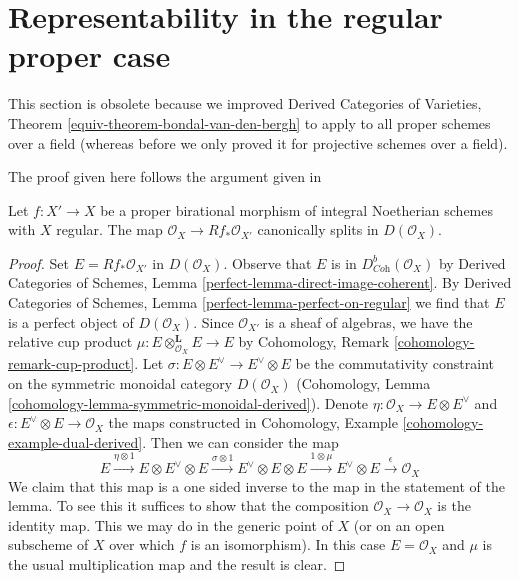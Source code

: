 \section{Representability in the regular proper case}
\label{section-regular-proper}

\noindent
This section is obsolete because we improved
Derived Categories of Varieties,
Theorem \ref{equiv-theorem-bondal-van-den-bergh}
to apply to all proper schemes over a field (whereas before
we only proved it for projective schemes over a field).

\begin{lemma}
\label{lemma-trace-map}
\begin{reference}
The proof given here follows the argument given in
\cite[Remark 3.4]{MS}
\end{reference}
Let $f : X' \to X$ be a proper birational morphism of integral Noetherian
schemes with $X$ regular. The map $\mathcal{O}_X \to Rf_*\mathcal{O}_{X'}$
canonically splits in $D(\mathcal{O}_X)$.
\end{lemma}

\begin{proof}
Set $E = Rf_*\mathcal{O}_{X'}$ in $D(\mathcal{O}_X)$.
Observe that $E$ is in $D^b_{\textit{Coh}}(\mathcal{O}_X)$ by
Derived Categories of Schemes, Lemma \ref{perfect-lemma-direct-image-coherent}.
By 
Derived Categories of Schemes, Lemma \ref{perfect-lemma-perfect-on-regular}
we find that $E$ is a perfect object of $D(\mathcal{O}_X)$.
Since $\mathcal{O}_{X'}$ is a sheaf of algebras, we have the
relative cup product $\mu : E \otimes_{\mathcal{O}_X}^\mathbf{L} E \to E$
by Cohomology, Remark \ref{cohomology-remark-cup-product}.
Let $\sigma : E \otimes E^\vee \to E^\vee \otimes E$ be the commutativity
constraint on the symmetric monoidal category $D(\mathcal{O}_X)$
(Cohomology, Lemma \ref{cohomology-lemma-symmetric-monoidal-derived}).
Denote $\eta : \mathcal{O}_X \to E \otimes E^\vee$ and
$\epsilon : E^\vee \otimes E \to \mathcal{O}_X$ the maps
constructed in Cohomology, Example \ref{cohomology-example-dual-derived}.
Then we can consider the map
$$
E \xrightarrow{\eta \otimes 1} E \otimes E^\vee \otimes E
\xrightarrow{\sigma \otimes 1} E^\vee \otimes E \otimes E
\xrightarrow{1 \otimes \mu} E^\vee \otimes E
\xrightarrow{\epsilon} \mathcal{O}_X
$$
We claim that this map is a one sided inverse to the map in the
statement of the lemma. To see this it suffices to show that
the composition $\mathcal{O}_X \to \mathcal{O}_X$ is the identity
map. This we may do in the generic point of $X$ (or on an open
subscheme of $X$ over which $f$ is an isomorphism). In this
case $E = \mathcal{O}_X$ and $\mu$ is the usual multiplication map
and the result is clear.
\end{proof}

